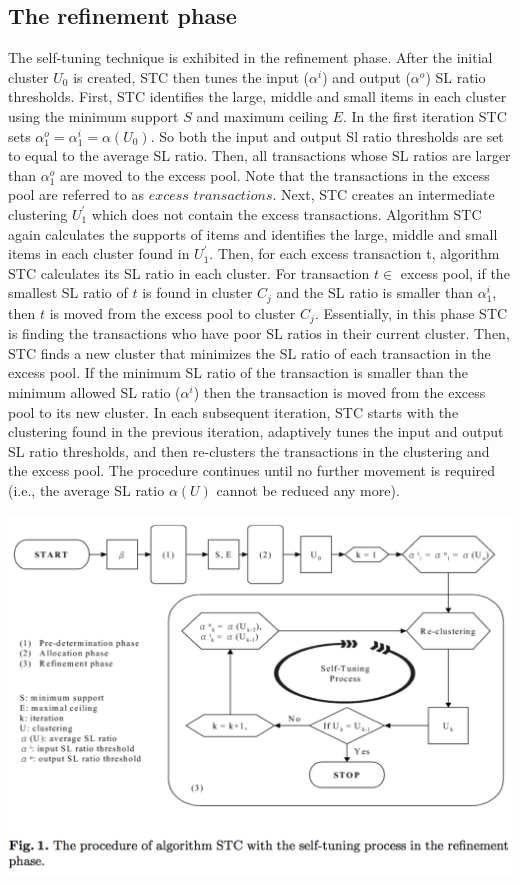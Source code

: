 \documentclass[11pt,reqno]{amsart}
\theoremstyle{definition}
\numberwithin{equation}{subsection}
\begin{document}
\subsection{The refinement phase}The self-tuning technique is exhibited in the refinement phase. After the initial cluster $U_0$ is created, STC then tunes the input ($\alpha ^i$) and output ($\alpha ^o$) SL ratio thresholds. First, STC identifies the large, middle and small items in each cluster using the minimum support $S$ and maximum ceiling $E$. In the first iteration STC sets $\alpha_1 ^o = \alpha_1 ^i = \alpha(U_0).$ So both the input and output Sl ratio thresholds are set to equal to the average SL ratio. Then, all transactions whose SL ratios are larger than $\alpha_1 ^o$ are moved to the excess pool. Note that the transactions in the excess pool are referred to as $excess$ $transactions$. Next, STC creates an intermediate clustering $U_1^ \prime$ which does not contain the excess transactions. Algorithm STC again calculates the supports of items and identifies the large, middle and small items in each cluster found in $U_1^ \prime$. Then, for each excess transaction t, algorithm STC calculates its SL ratio in each cluster.  For transaction $t \in$ excess pool, if the smallest SL ratio of $t$ is found in cluster $C_j$ and the SL ratio is smaller than $\alpha_1 ^i$, then $t$ is moved from the excess pool to cluster $C_j$. Essentially, in this phase STC is finding the transactions who have poor SL ratios in their current cluster. Then, STC finds a new cluster that minimizes the SL ratio of each transaction in the excess pool.  If the minimum SL ratio of the transaction is smaller than the minimum allowed SL ratio ($\alpha^i$) then the transaction is moved from the excess pool to its new cluster. In each subsequent iteration, STC starts with the clustering found in the previous iteration, adaptively tunes the input and output SL ratio thresholds, and then re-clusters the transactions in the clustering and the excess pool. The procedure continues until no further movement is required (i.e., the average SL ratio $\alpha(U)$ cannot be reduced any more).


\includegraphics[scale=.70]{pic4}
\end{document}
